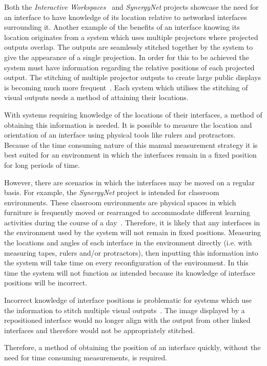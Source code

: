 \documentclass{bmcart}
\begin{document}
Both the {\emph{Interactive Workspaces}}~\cite{Johanson2002} and {\emph{SynergyNet}} projects showcase the need for an interface to have knowledge of its location relative to networked interfaces surrounding it.
Another example of the benefits of an interface knowing its location originates from a system which uses multiple projectors where projected outputs overlap.
The outputs are seamlessly stitched together by the system to give the appearance of a single projection.
In order for this to be achieved the system must have information regarding the relative positions of each projected output.
The stitching of multiple projector outputs to create large public displays is becoming much more frequent~\cite{Jones2011}.
Each system which utilises the stitching of visual outputs needs a method of attaining their locations.

With systems requiring knowledge of the locations of their interfaces, a method of obtaining this information is needed.
It is possible to measure the location and orientation of an interface using physical tools like rulers and protractors. 
Because of the time consuming nature of this manual measurement strategy it is best suited for an environment in which the interfaces remain in a fixed position for long periods of time.

However, there are scenarios in which the interfaces may be moved on a regular basis.
For example, the {\emph{SynergyNet}} project is intended for classroom environments.
These classroom environments are physical spaces in which furniture is frequently moved or rearranged to accommodate different learning activities during the course of a day~\cite{Tiburcio2005}.
Therefore, it is likely that any interfaces in the environment used by the system will not remain in fixed positions.
Measuring the locations and angles of each interface in the environment directly (i.e. with measuring tapes, rulers and/or protractors), then inputting this information into the system will take time on every reconfiguration of the environment.
In this time the system will not function as intended because its knowledge of interface positions will be incorrect.

Incorrect knowledge of interface positions is problematic for systems which use the information to stitch multiple visual outputs~\cite{Dietz2004,Jones2011}.
The image displayed by a repositioned interface would no longer align with the output from other linked interfaces and therefore would not be appropriately stitched.

Therefore, a method of obtaining the position of an interface quickly, without the need for time consuming measurements, is required.
\end{document}
